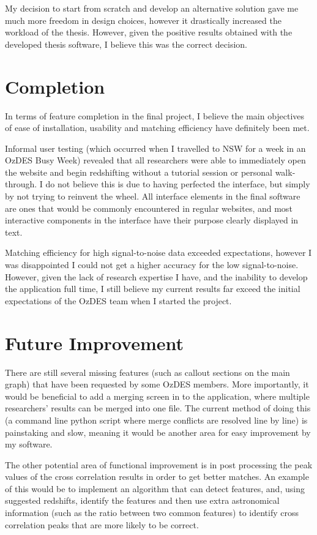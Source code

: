 \documentclass[titlesmallcaps, examinerscopy, copyrightpage]{uqthesis}
\begin{document}
My decision to start from scratch and develop an alternative solution gave me much more freedom in design choices, however it drastically increased the workload of the thesis. However, given the positive results obtained with the developed thesis software, I believe this was the correct decision.


\section{Completion}

In terms of feature completion in the final project, I believe the main objectives of ease of installation, usability and matching efficiency have definitely been met.

Informal user testing (which occurred when I travelled to NSW for a week in an OzDES Busy Week) revealed that all researchers were able to immediately open the website and begin redshifting without a tutorial session or personal walk-through. I do not believe this is due to having perfected the interface, but simply by not trying to reinvent the wheel. All interface elements in the final software are ones that would be commonly encountered in regular websites, and most interactive components in the interface have their purpose clearly displayed in text.

Matching efficiency for high signal-to-noise data exceeded expectations, however I was disappointed I could not get a higher accuracy for the low signal-to-noise. However, given the lack of research expertise I have, and the inability to develop the application full time, I still believe my current results far exceed the initial expectations of the OzDES team when I started the project.


\section{Future Improvement}

There are still several missing features (such as callout sections on the main graph) that have been requested by some OzDES members. More importantly, it would be beneficial to add a merging screen in to the application, where multiple researchers' results can be merged into one file. The current method of doing this (a command line python script where
merge conflicts are resolved line by line) is painstaking and slow, meaning it would be another area for easy improvement by my software.

The other potential area of functional improvement is in post processing the peak values of the cross correlation results in order to get better matches. An example of this would be to implement an algorithm that can detect features, and, using suggested redshifts, identify the features and then use extra astronomical information (such as the ratio between two common features) to identify cross correlation peaks that are more likely to be correct.
\end{document}
